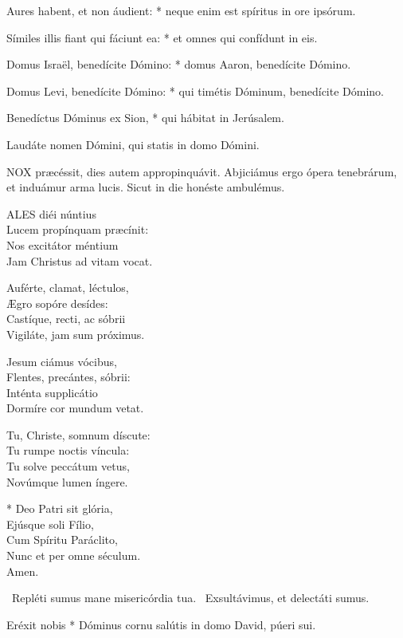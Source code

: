 Aures habent, et non áudient: * neque enim est spíritus in ore ipsórum.

Símiles illis fiant qui fáciunt ea: * et omnes qui confídunt in eis.

Domus Israël, benedícite Dómino: * domus Aaron, benedícite Dómino.

Domus Levi, benedícite Dómino: * qui timétis Dóminum, benedícite Dómino.

Benedíctus Dóminus ex Sion, * qui hábitat in Jerúsalem.

 Laudáte nomen Dómini, qui statis in domo Dómini.



\lettrine[lines=2]{N}{OX} præcéssit, dies autem appropinquávit. Abjiciámus ergo ópera tenebrárum, et induámur arma lucis. Sicut in die honéste ambulémus.


\lettrine[lines=2]{A}{LES} diéi núntius\\
Lucem propínquam præcínit:\\
Nos excitátor méntium\\
Jam Christus ad vitam vocat.

Auférte, clamat, léctulos,\\
Ægro sopóre desídes:\\
Castíque, recti, ac sóbrii\\
Vigiláte, jam sum próximus.

Jesum ciámus vócibus,\\
Flentes, precántes, sóbrii:\\
Inténta supplicátio\\
Dormíre cor mundum vetat.

Tu, Christe, somnum díscute:\\
Tu rumpe noctis víncula:\\
Tu solve peccátum vetus,\\
Novúmque lumen íngere.

* Deo Patri sit glória,\\
Ejúsque soli Fílio,\\
Cum Spíritu Paráclito,\\
Nunc et per omne séculum.\\
Amen.

\V\ Repléti sumus mane misericórdia tua. \R\ Exsultávimus, et delectáti sumus.

 Eréxit nobis * Dóminus cornu salútis in domo David, púeri sui.

